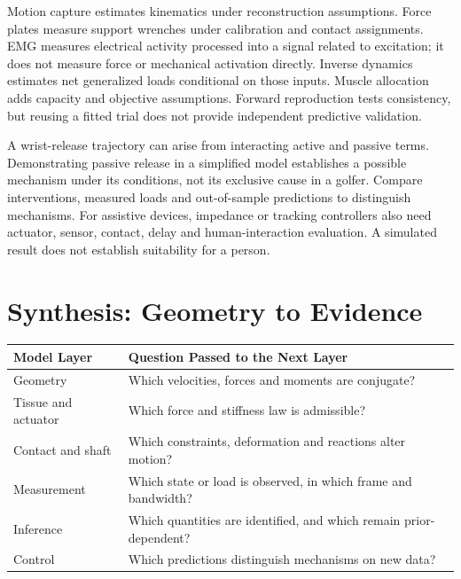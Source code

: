 Motion capture estimates kinematics under reconstruction assumptions. Force plates
measure support wrenches under calibration and contact assignments. EMG measures
electrical activity processed into a signal related to excitation; it does not
measure force or mechanical activation directly. Inverse dynamics estimates net
generalized loads conditional on those inputs. Muscle allocation adds capacity and
objective assumptions. Forward reproduction tests consistency, but reusing a fitted
trial does not provide independent predictive validation.

A wrist-release trajectory can arise from interacting active and passive terms.
Demonstrating passive release in a simplified model establishes a possible mechanism
under its conditions, not its exclusive cause in a golfer. Compare interventions,
measured loads and out-of-sample predictions to distinguish mechanisms. For assistive
devices, impedance or tracking controllers also need actuator, sensor, contact,
delay and human-interaction evaluation. A simulated result does not establish
suitability for a person.

\section{Synthesis: Geometry to Evidence}
\begin{center}
\begin{tabular}{@{}p{}p{}@{}}
\toprule
\textbf{Model Layer} & \textbf{Question Passed to the Next Layer}\\
\midrule
Geometry & Which velocities, forces and moments are conjugate?\\
Tissue and actuator & Which force and stiffness law is admissible?\\
Contact and shaft & Which constraints, deformation and reactions alter motion?\\
Measurement & Which state or load is observed, in which frame and bandwidth?\\
Inference & Which quantities are identified, and which remain prior-dependent?\\
Control & Which predictions distinguish mechanisms on new data?\\
\bottomrule
\end{tabular}
\end{center}

